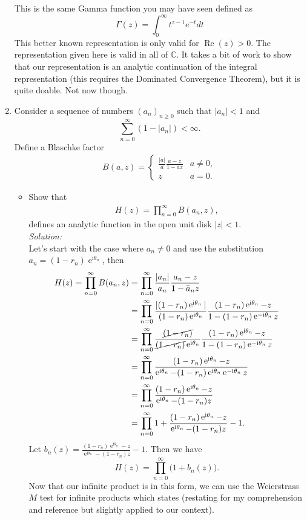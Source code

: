 \documentclass[10pt]{amsart}
\newcommand{\I}{\mathrm{i}}
\DeclareMathOperator{\E}{e}
\theoremstyle{nonumberplain}
\begin{document}
\begin{enumerate}[label={\bf {\arabic*}:}]
\noindent
This is the same Gamma function you may have seen defined as
$$
\Gamma(z)=\int_0^{\infty} t^{z-1} e^{-t} d t
$$
This better known representation is only valid for
$\operatorname{Re}(z)>0$. The representation given here is valid in
all of $\mathbb{C}$. It takes a bit of work to show that our
representation is an analytic continuation of the integral
representation (this requires the Dominated Convergence Theorem), but
it is quite doable. Not now though. \\
\newpage

\item Consider a sequence of numbers $(a_n)_{n \geq 0}$ such that $|a_n| < 1$ and
$$ \sum_{n = 0}^\infty (1 - |a_n|) < \infty. $$
Define a Blaschke factor
\begin{align*}
B(a,z) =
	\begin{cases}
		\frac{|a|}{a} \frac{ a - z}{ 1 - \bar a z} & a \neq 0,\\
  		z & a  =0.
  	\end{cases}
\end{align*}
\begin{itemize}
\item Show that
\begin{align*}
H(z) = \prod_{n=0}^\infty B(a_n,z),
\end{align*}
defines an analytic function in the open unit disk $|z| < 1$. \\
\textit{Solution:} \\
Let's start with the case where $a_n \neq 0$ and use the substitution $a_n = (1 - r_n)\E^{\I \theta_n}$, then
\begin{align*}
H(z) = \prod_{n=0}^\infty B(a_n,z)
	&= \prod_{n=0}^\infty \frac{|a_n|}{a_n} \frac{ a_n - z}{ 1 - \bar a_n z} \\
	&= \prod_{n=0}^\infty \frac{|(1 - r_n)\E^{\I \theta_n}|}{(1 - r_n)\E^{\I \theta_n}} \frac{ (1 - r_n)\E^{\I \theta_n} - z}{ 1 - (1 - r_n)\E^{-\I \theta_n} z} \\
	&= \prod_{n=0}^\infty \frac{\cancel{(1 - r_n)}}{\cancel{(1 - r_n)}\E^{\I \theta_n}} \frac{ (1 - r_n)\E^{\I \theta_n} - z}{ 1 -(1 - r_n)\E^{-\I \theta_n} z} \\
	&= \prod_{n=0}^\infty \frac{ (1 - r_n)\E^{\I \theta_n} - z}{ \E^{\I \theta_n} - (1 - r_n)\E^{\I \theta_n}\E^{-\I \theta_n} z} \\
	&= \prod_{n=0}^\infty \frac{ (1 - r_n)\E^{\I \theta_n} - z}{ \E^{\I \theta_n} - (1 - r_n) z} \\
	&= \prod_{n=0}^\infty 1 + \frac{ (1 - r_n)\E^{\I \theta_n} - z}{ \E^{\I \theta_n} - (1 - r_n) z} - 1.
\end{align*}
Let $b_n(z) = \frac{ (1 - r_n)\E^{\I \theta_n} - z}{ \E^{\I \theta_n} - (1 - r_n) z} - 1$.
Then we have 
$$
H(z) = \prod_{n=0}^\infty \big(1 + b_n(z)\big).
$$
Now that our infinite product is in this form, we can use the Weierstrass $M$ test for infinite products which states (restating for my comprehension and reference but slightly applied to our context). \\


\end{itemize}
\end{enumerate}
\end{document}
